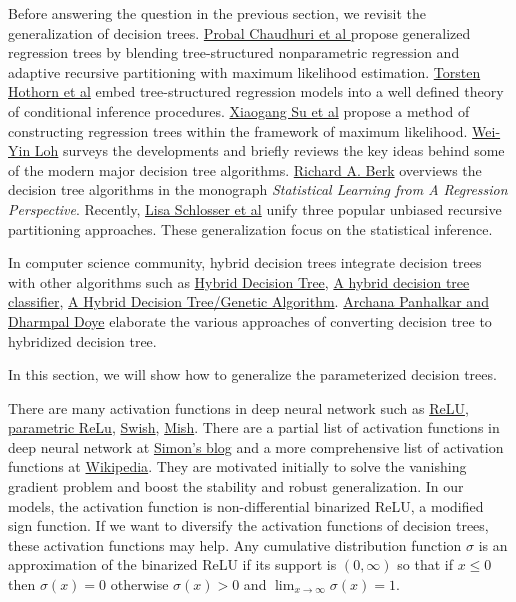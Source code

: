 \documentclass[UTF8]{article}
\begin{document}
Before answering the question in the previous section, we revisit the generalization of decision trees.
\href{http://pages.stat.wisc.edu/~loh/treeprogs/guide/grapes.pdf}{Probal Chaudhuri et al }
propose generalized regression trees
by blending tree-structured nonparametric regression and
adaptive recursive partitioning with maximum likelihood estimation.
\href{https://epub.wu.ac.at/676/1/document.pdf}{Torsten Hothorn et al} embed tree-structured regression models
into a well defined theory of conditional inference procedures.
\href{https://www.researchgate.net/publication/261660212_Maximum_Likelihood_Regression_Trees}{Xiaogang Su et al}
propose a method of constructing regression trees within the framework of maximum likelihood.
\href{http://pages.stat.wisc.edu/~loh/treeprogs/guide/LohISI14.pdf}{Wei-Yin Loh}
surveys the developments and briefly reviews
the key ideas behind some of the modern major decision tree algorithms.
\href{https://www.researchgate.net/profile/Richard_Berk}{Richard A. Berk} overviews the decision tree algorithms
in the monograph \emph{Statistical Learning from A Regression Perspective}.
Recently, \href{https://arxiv.org/abs/1906.10179}{Lisa Schlosser et al}
unify three popular  unbiased recursive partitioning approaches.
These generalization focus on the statistical inference.

In computer science community, hybrid decision trees integrate decision trees with other algorithms such as
\href{https://cs.nju.edu.cn/zhouzh/zhouzh.files/publication/kbs02.pdf}{Hybrid Decision Tree},
\href{https://dl.acm.org/citation.cfm?id=2596353}{A hybrid decision tree classifier},
\href{https://sci2s.ugr.es/keel/pdf/algorithm/articulo/DT-GA.pdf}{A Hybrid Decision Tree/Genetic Algorithm}.
\href{https://link.springer.com/chapter/10.1007/978-981-10-1678-3_8}{Archana Panhalkar and Dharmpal Doye}
elaborate the various approaches of converting decision tree to hybridized decision tree.

In this section, we will show how to generalize the parameterized decision trees.

There are many activation functions in deep neural network such as
\href{https://arxiv.org/abs/1611.01491}{ReLU},
\href{https://arxiv.org/pdf/1502.01852.pdf}{parametric ReLu},
\href{https://arxiv.org/pdf/1710.05941.pdf}{Swish},
\href{https://arxiv.org/abs/1908.08681}{Mish}.
There are a partial list of activation functions in deep neural network at
\href{https://www.simonwenkel.com/2018/05/15/activation-functions-for-neural-networks.html}{Simon's blog}
and a more comprehensive list of activation functions
at \href{https://en.wikipedia.org/wiki/Activation_function}{Wikipedia}.
They are motivated initially to solve the vanishing gradient problem
and boost the stability and robust generalization.
In our models, the activation function is non-differential binarized ReLU, a modified sign function.
If we want to diversify the activation functions of decision trees,
these activation functions may help.
Any cumulative distribution function $\sigma$ is an approximation of the binarized ReLU
if its support is $(0,\infty)$ so that if $x\leq 0$ then $\sigma(x)=0$
otherwise $\sigma(x)>0$ and $\lim_{x\to\infty}\sigma(x)=1$.
\end{document}
